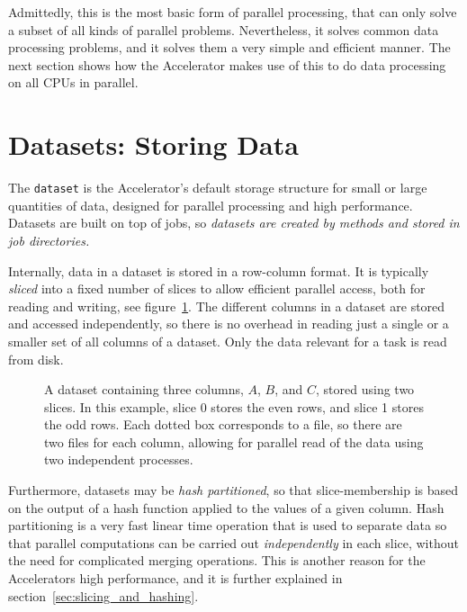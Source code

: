 Admittedly, this is the most basic form of parallel processing, that
can only solve a subset of all kinds of parallel problems.
Nevertheless, it solves common data processing problems, and it solves
them a very simple and efficient manner.  The next section shows how
the Accelerator makes use of this to do data processing on all CPUs in
parallel.




\section{Datasets: Storing Data}

The \texttt{dataset} is the Accelerator's default storage structure
for small or large quantities of data, designed for parallel
processing and high performance.  Datasets are built on top of jobs,
so \emph{datasets are created by methods and stored in job
directories.}

Internally, data in a dataset is stored in a row-column format.  It is
typically \emph{sliced} into a fixed number of slices to allow
efficient parallel access, both for reading and writing, see
figure~\ref{fig:dataset}. The different columns in a dataset are
stored and accessed independently, so there is no overhead in reading
just a single or a smaller set of all columns of a dataset.  Only the
data relevant for a task is read from disk.

\begin{figure}[h!]
  \begin{center}
    
    \caption{A dataset containing three columns, $A$, $B$, and $C$,
      stored using two slices.  In this example, slice 0 stores the
      even rows, and slice 1 stores the odd rows.  Each dotted box
      corresponds to a file, so there are two files for each column,
      allowing for parallel read of the data using two independent
      processes.}
    \label{fig:dataset}
  \end{center}
\end{figure}

Furthermore, datasets may be \textsl{hash partitioned}, so that
slice-membership is based on the output of a hash function applied to
the values of a given column.  Hash partitioning is a very fast linear
time operation that is used to separate data so that parallel
computations can be carried out \emph{independently} in each slice,
without the need for complicated merging operations.  This is another
reason for the Accelerators high performance, and it is further
explained in section~\ref{sec:slicing_and_hashing}.



